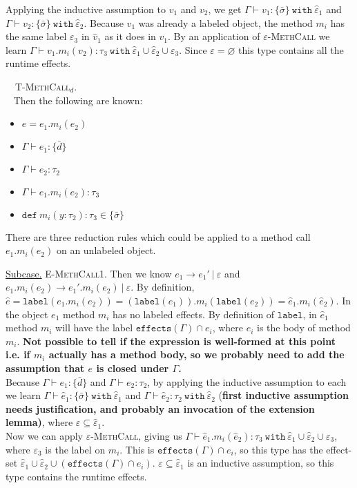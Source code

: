 \documentclass{llncs}
\newcommand{\keywadj}[1]{\mathtt{#1}}
\newcommand{\keyw}[1]{\keywadj{#1}~}
\newcommand{\kw}[1]{\keyw{ #1 }}
\newcommand{\kwa}[1]{\keywadj{ #1 }}
\newcommand{\proofcase}[2]{
	\begin{adjustwidth}{1.5em}{0pt}
		\fbox{Case.}~~#1. \\ ~#2
	\end{adjustwidth}
}
\newcommand{\subcase}[1] {
	\begin{adjustwidth}{2.2em}{0pt}
		\underline{Subcase.} #1
	\end{adjustwidth}
}
\newcommand{\type}[2]{
	#1~\keyw{with} #2
}
\begin{document}
{{{\noindent
Applying the inductive assumption to $v_1$ and $v_2$, we get $\Gamma \vdash v_1 : \type{\{ \bar \sigma \}}{\hat \varepsilon_1}$ and $\Gamma \vdash v_2 : \type{\{ \bar \sigma \}}{\hat \varepsilon_2}$. Because $v_1$ was already a labeled object, the method $m_i$ has the same label $\varepsilon_3$ in $\hat v_1$ as it does in $v_1$. By an application of \textsc{$\varepsilon$-MethCall} we learn $\Gamma \vdash v_1.m_i(v_2) : \type{\tau_3}{\hat \varepsilon_1 \cup \hat \varepsilon_2 \cup \varepsilon_3}$. Since $\varepsilon = \varnothing$ this type contains all the runtime effects.\\	
	}
}

\proofcase{\textsc{T-MethCall$_d$}}{
Then the following are known:
\begin{itemize}
	\item $e = e_1.m_i(e_2)$
	\item $\Gamma \vdash e_1 : \{ \bar d \}$
	\item $\Gamma \vdash e_2 : \tau_2$
	\item $\Gamma \vdash e_1.m_i(e_2) : \tau_3$
	\item $\keywadj{def}~m_i(y:\tau_2) : \tau_3 \in \{ \bar \sigma \}$
\end{itemize}

\noindent
There are three reduction rules which could be applied to a method call $e_1.m_i(e_2)$ on an unlabeled object.\\

	\subcase{\textsc{E-MethCall1}. Then we know $e_1 \longrightarrow e_1'~|~\varepsilon$ and $e_1.m_i(e_2) \longrightarrow e_1'.m_i(e_2)~|~\varepsilon$. By definition, $\hat e = \kwa{label}(e_1.m_i(e_2)) = (\kwa{label}(e_1)).m_i(\kwa{label}(e_2)) = \hat e_1.m_i(\hat e_2)$. In the object $e_1$ method $m_i$ has no labeled effects. By definition of $\kwa{label}$, in $\hat e_1$ method $m_i$ will have the label $\kwa{effects}(\Gamma) \cap e_i$, where $e_i$ is the body of method $m_i$. \textbf{Not possible to tell if the expression is well-formed at this point i.e. if $m_i$ actually has a method body, so we probably need to add the assumption that $e$ is closed under $\Gamma$.}\\
	
\noindent
Because $\Gamma \vdash e_1 : \{ \bar d \}$ and $\Gamma \vdash e_2 : \tau_2$, by applying the inductive assumption to each we learn $\Gamma \vdash \hat e_1 : \type{\{ \bar \sigma \}}{\hat \varepsilon_1}$ and $\Gamma \vdash \hat e_2 : \tau_2~\kw{with} \hat \varepsilon_2$ (\textbf{first inductive assumption needs justification, and probably an invocation of the extension lemma)}, where $\varepsilon \subseteq \hat \varepsilon_1$. \\

\noindent
Now we can apply \textsc{$\varepsilon$-MethCall}, giving us $\Gamma \vdash \hat e_1.m_i(\hat e_2) : \type{\tau_3}{\hat \varepsilon_1 \cup \hat \varepsilon_2 \cup \varepsilon_3 }$, where $\varepsilon_3$ is the label on $m_i$. This is $\kwa{effects}(\Gamma) \cap e_i$, so this type has the effect-set $\hat \varepsilon_1 \cup \hat \varepsilon_2 \cup (\kwa{effects}(\Gamma) \cap e_i)$. $\varepsilon \subseteq \hat \varepsilon_1$ is an inductive assumption, so this type contains the runtime effects.
	}
}
}
\end{document}
